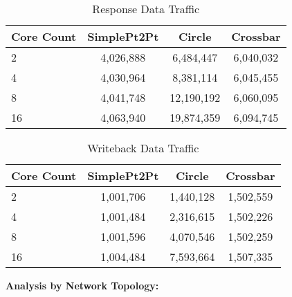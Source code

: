 \documentclass[9pt]{IEEEtran}
\begin{document}
\begin{table}[htbp]
\centering
\caption{Response Data Traffic}
\begin{adjustbox}{max width=\columnwidth}
\begin{tabular}{@{}lccc@{}}
\toprule
Core Count & SimplePt2Pt & Circle & Crossbar \\
\midrule
2  & 4,026,888 & 6,484,447  & 6,040,032 \\
4  & 4,030,964 & 8,381,114  & 6,045,455 \\
8  & 4,041,748 & 12,190,192 & 6,060,095 \\
16 & 4,063,940 & 19,874,359 & 6,094,745 \\
\bottomrule
\end{tabular}
\end{adjustbox}
\end{table}

\begin{table}[htbp]
\centering
\caption{Writeback Data Traffic}
\begin{adjustbox}{max width=\columnwidth}
\begin{tabular}{@{}lccc@{}}
\toprule
Core Count & SimplePt2Pt & Circle & Crossbar \\
\midrule
2  & 1,001,706 & 1,440,128 & 1,502,559 \\
4  & 1,001,484 & 2,316,615 & 1,502,226 \\
8  & 1,001,596 & 4,070,546 & 1,502,259 \\
16 & 1,004,484 & 7,593,664 & 1,507,335 \\
\bottomrule
\end{tabular}
\end{adjustbox}
\end{table}

\textbf{Analysis by Network Topology:}
\end{document}
